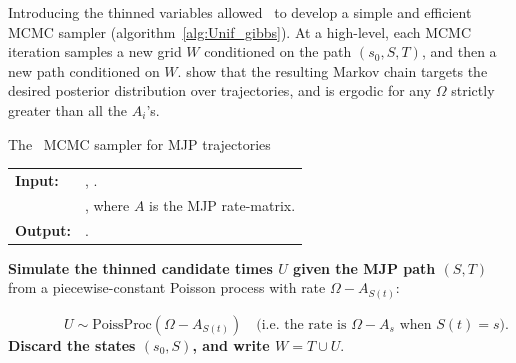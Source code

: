 Introducing the thinned variables allowed~\cite{RaoTeh13} to develop a simple and efficient MCMC sampler (algorithm~\ref{alg:Unif_gibbs}). 
At a high-level, each MCMC iteration samples a new grid $W$ conditioned on the path $(s_0,S,T)$, and then a new path conditioned on $W$. 
\cite{RaoTeh13} show that the resulting Markov chain targets the desired posterior distribution over trajectories, and is ergodic for any $\Omega$ strictly greater than all the $A_i$'s. 
\begin{algorithm}[H]
  \caption{The~\cite{RaoTeh13} MCMC sampler for MJP trajectories}
   \label{alg:Unif_gibbs}
  \begin{tabular}{l l}
   \textbf{Input:  } & \text{Prior $\pi_0$, observations $X$}, 
                       \text{the previous path $S(t) = (s_0, S, T)$}.\\ 
                     & \text{Parameter $\Omega > \max_i A_i$}, where
   $A$ is the MJP rate-matrix.\\
   \textbf{Output:  }& \text{New MJP trajectory $S' (t) = (s'_0, S', T')$}.\\
   \hline
   \end{tabular}
   \begin{algorithmic}[1]
\State \textbf{ Simulate the thinned candidate times $U$ given the MJP path $(S,T)$ } 
from a piecewise-constant Poisson process with rate $\Omega-A_{S(t)}$: 

$ \qquad \qquad  U \sim \text{PoissProc}(\Omega - A_{S(t)})  \quad \text{(i.e.\ the rate is $\Omega-A_s$ when $S(t) = s$).}$
\State \textbf{
  Discard the states $(s_0,S)$, and write %
  $W = T \cup U$}.


\end{algorithmic}
\end{algorithm}
